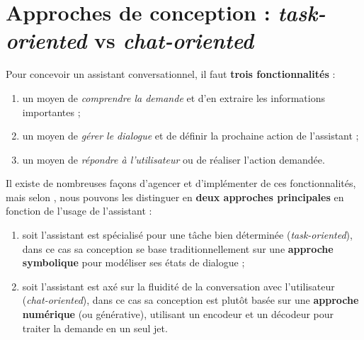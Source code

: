 
	\section{Approches de conception : \textit{task-oriented} vs \textit{chat-oriented}}
	\label{annex:B.2-ANNEXE-CHATBOTS-APPROCHES}
	
		Pour concevoir un assistant conversationnel, il faut \textbf{trois fonctionnalités} :
		\begin{enumerate}
			\item un moyen de \textit{comprendre la demande} et d'en extraire les informations importantes ;
			\item un moyen de \textit{gérer le dialogue} et de définir la prochaine action de l'assistant ;
			\item un moyen de \textit{répondre à l'utilisateur} ou de réaliser l'action demandée.
		\end{enumerate}
		
		
		Il existe de nombreuses façons d'agencer et d'implémenter de ces fonctionnalités, mais selon \cite{chen-etal:2017:survey-dialogue-systems}, nous pouvons les distinguer en \textbf{deux approches principales} en fonction de l'usage de l'assistant :
		\begin{enumerate}
			\item soit l'assistant est spécialisé pour une tâche bien déterminée (\textit{task-oriented}), dans ce cas sa conception se base traditionnellement sur une \textbf{approche symbolique} pour modéliser ses états de dialogue ;
			\item soit l'assistant est axé sur la fluidité de la conversation avec l'utilisateur (\textit{chat-oriented}), dans ce cas sa conception est plutôt basée sur une \textbf{approche numérique} (ou générative), utilisant un encodeur et un décodeur pour traiter la demande en un seul jet.
		\end{enumerate}
		
